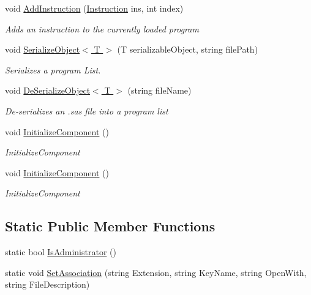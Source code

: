 \begin{DoxyCompactItemize}
void \hyperlink{class_c_p_u___o_s___simulator_1_1_main_window_ae73f56ccee0f45b0df54438b3d397dd9}{Add\+Instruction} (\hyperlink{class_c_p_u___o_s___simulator_1_1_c_p_u_1_1_instruction}{Instruction} ins, int index)
\begin{DoxyCompactList}\small\item\em Adds an instruction to the currently loaded program \end{DoxyCompactList}\item 
void \hyperlink{class_c_p_u___o_s___simulator_1_1_main_window_a80985670e45349866a463b766f92e27b}{Serialize\+Object$<$ T $>$} (T serializable\+Object, string file\+Path)
\begin{DoxyCompactList}\small\item\em Serializes a program List. \end{DoxyCompactList}\item 
void \hyperlink{class_c_p_u___o_s___simulator_1_1_main_window_a44e09f35524cd53ddab77488989c5833}{De\+Serialize\+Object$<$ T $>$} (string file\+Name)
\begin{DoxyCompactList}\small\item\em De-\/serializes an .sas file into a program list \end{DoxyCompactList}\item 
void \hyperlink{class_c_p_u___o_s___simulator_1_1_main_window_a30724af44ae89c2172130c2dd36e145c}{Initialize\+Component} ()
\begin{DoxyCompactList}\small\item\em Initialize\+Component \end{DoxyCompactList}\item 
void \hyperlink{class_c_p_u___o_s___simulator_1_1_main_window_a30724af44ae89c2172130c2dd36e145c}{Initialize\+Component} ()
\begin{DoxyCompactList}\small\item\em Initialize\+Component \end{DoxyCompactList}\end{DoxyCompactItemize}
\subsection*{Static Public Member Functions}
\begin{DoxyCompactItemize}
\item 
static bool \hyperlink{class_c_p_u___o_s___simulator_1_1_main_window_ac84f58171f511e299566cb11c3a53e48}{Is\+Administrator} ()
\item 
static void \hyperlink{class_c_p_u___o_s___simulator_1_1_main_window_ac2d9309ba55c536660c9b98dff7e40b1}{Set\+Association} (string Extension, string Key\+Name, string Open\+With, string File\+Description)
\end{DoxyCompactItemize}
